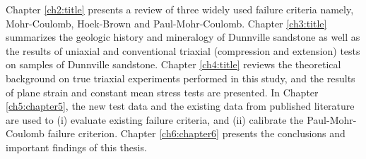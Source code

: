 Chapter \ref{ch2:title} presents a review of three widely used failure criteria namely, Mohr-Coulomb, Hoek-Brown and Paul-Mohr-Coulomb. Chapter \ref{ch3:title} summarizes the geologic history and mineralogy of Dunnville sandstone as well as the results of uniaxial and conventional triaxial (compression and extension) tests on samples of Dunnville sandstone. Chapter \ref{ch4:title} reviews the theoretical background on true triaxial experiments performed in this study, and the results of plane strain and constant mean stress tests are presented. In Chapter \ref{ch5:chapter5}, the new test data and the existing data from published literature are used to (i) evaluate existing failure criteria, and (ii) calibrate the Paul-Mohr-Coulomb failure criterion. Chapter \ref{ch6:chapter6} presents the conclusions and important findings of this thesis. 
